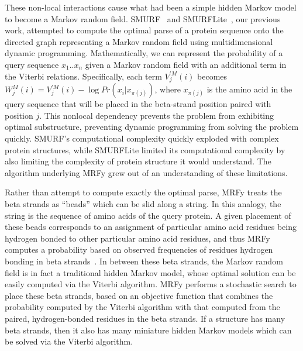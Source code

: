 \documentclass[preprint,nonatbib,blockstyle,nocopyrightspace,times]{sigplanconf}
\let\cite\citep
\begin{document}
These non-local interactions cause what had been a simple hidden Markov model 
to become a Markov random field.
SMURF~\cite{Menke:2010ti} and SMURFLite~\cite{Daniels:2012}, our previous work,
attempted to compute the 
optimal parse of a protein sequence onto the directed graph representing a 
Markov random field using multidimensional dynamic programming.
Mathematically, we can represent the probability of a query sequence 
$x_{1}..x_{n}$ given a Markov random field with an additional term in the
Viterbi relations.
Specifically, each term $V_{j}^{\prime M}(i)$ becomes
$W_{j}^{M}(i) = V_{j}^{\prime M}(i) - \log Pr(x_{i} | x_{\pi(j)})$, where
$x_{\pi(j)}$ is the amino acid in the query sequence that will be placed
in the beta-strand position paired with position $j$.
This nonlocal dependency prevents the problem from exhibiting optimal substructure,
preventing dynamic programming from solving the problem quickly.
SMURF's 
computational complexity quickly exploded with complex protein structures, 
while SMURFLite limited its computational complexity by also limiting the 
complexity of protein structure it would understand.
The algorithm underlying 
MRFy grew out of an understanding of these limitations.


Rather than attempt to compute exactly the optimal parse, MRFy treats the beta 
strands as ``beads'' which can be slid along a string.
In this analogy, the 
string is the sequence of amino acids of the query protein.
A given placement 
of these beads corresponds to an assignment of particular amino acid residues 
being hydrogen bonded to other particular amino acid residues, and thus MRFy 
computes a probability based on observed frequencies of residues hydrogen 
bonding in beta strands~\cite{Cowen:2002p588}.
In between these beta strands, the 
Markov random field is in fact a traditional hidden Markov model, whose optimal 
solution can be easily computed via the Viterbi algorithm.
MRFy performs a 
stochastic search to place these beta strands, based on an objective function 
that combines the probability computed by the Viterbi algorithm with that 
computed from the paired, hydrogen-bonded residues in the beta strands.
If a 
structure has many beta strands, then it also has many miniature hidden Markov 
models which can be solved via the Viterbi algorithm.
\end{document}
